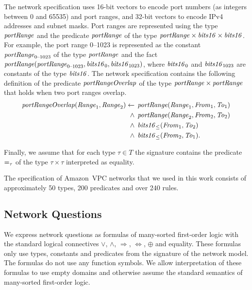 The network specification uses 16-bit vectors to encode port numbers (as integers between 0 and 65535) and port ranges, and 32-bit vectors to encode IPv4 addresses and subnet masks. Port ranges are represented using the type $\mathit{portRange}$ and the predicate $\mathit{portRange}$ of the type $\mathit{portRange}\times\mathit{bits16}\times\mathit{bits16}$. For example, the port range 0--1023 is represented as the constant $\mathit{portRange}_\text{0--1023}$ of the type $\mathit{portRange}$ and the fact $\mathit{portRange}(\mathit{portRange}_\text{0--1023},\allowbreak\mathit{bits16}_0,\allowbreak\mathit{bits16}_{1023})$, where $\mathit{bits16}_0$ and $\mathit{bits16}_{1023}$ are constants of the type $\mathit{bits16}$. The network specification contains the following definition of the predicate $\mathit{portRangeOverlap}$ of the type $\mathit{portRange}\times\mathit{portRange}$ that holds when two port ranges overlap.
\begin{equation*}
  \begin{aligned}
\mathit{portRangeOverlap}(\mathit{Range}_1,\mathit{Range}_2)\leftarrow\:&\:\mathit{portRange}(\mathit{Range}_1,\mathit{From}_1,\mathit{To}_1) \\
  \wedge\:&\:\mathit{portRange}(\mathit{Range}_2,\mathit{From}_2,\mathit{To}_2) \\
  \wedge\:&\:\mathit{bits16}_\le(\mathit{From}_1,\mathit{To}_2) \\
  \wedge\:&\:\mathit{bits16}_\le(\mathit{From}_2,\mathit{To}_1).
  \end{aligned}
\end{equation*}

Finally, we assume that for each type $\tau\in T$ the signature contains the predicate $\mathit{=}_\tau$ of the type $\tau\times\tau$ interpreted as equality.

The specification of Amazon~VPC networks that we used in this work consists of approximately 50 types, 200 predicates and over 240 rules.


\subsection{Network Questions}
\label{sect:aws/reachability/properties}

We express network questions as formulas of many-sorted first-order logic with the standard logical connectives $\vee$, $\wedge$, $\Rightarrow$, $\Leftrightarrow$, $\oplus$ and equality. These formulas only use types, constants and predicates from the signature of the network model. The formulas do not use any function symbols. We allow interpretation of these formulas to use empty domains and otherwise assume the standard semantics of many-sorted first-order logic.

